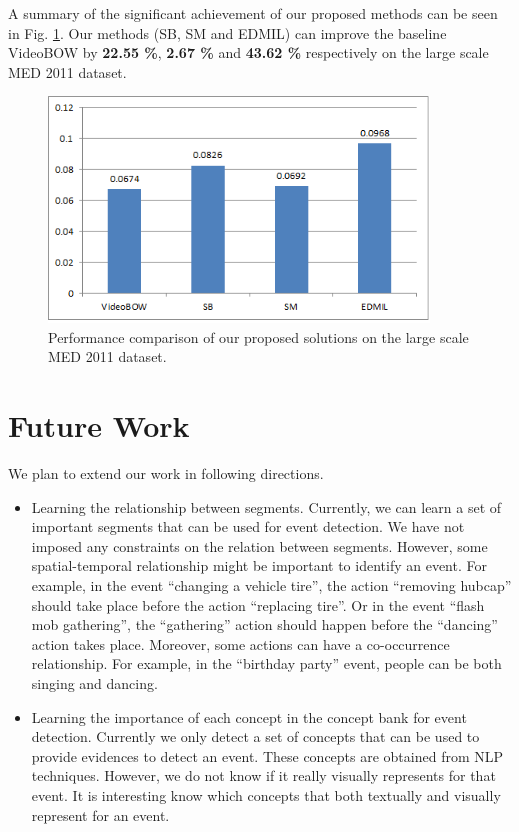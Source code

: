 A summary of the significant achievement of our proposed methods can be seen in Fig. \ref{c6_summary}. Our methods (SB, SM and EDMIL) can improve the baseline VideoBOW by \textbf{22.55 \%}, \textbf{2.67 \%} and \textbf{43.62 \%} respectively on the large scale MED 2011 dataset.

\begin{figure}
	\centering
	\includegraphics[width=0.9\textwidth]{summary.png}
	\caption{Performance comparison of our proposed solutions on the large scale MED 2011 dataset.}
	\label{c6_summary}
\end{figure}
	
\section{Future Work}
We plan to extend our work in following directions.
\begin{itemize}
	\item Learning the relationship between segments. Currently, we can learn a set of important segments that can be used for event detection. We have not imposed any constraints on the relation between segments. However, some spatial-temporal relationship might be important to identify an event. For example, in the event ``changing a vehicle tire'', the action ``removing hubcap'' should take place before the action ``replacing tire''. Or in the event ``flash mob gathering'', the ``gathering'' action should happen before the ``dancing'' action takes place. Moreover, some actions can have a co-occurrence relationship. For example, in the ``birthday party'' event, people can be both singing and dancing. 
	\item Learning the importance of each concept in the concept bank for event detection. Currently we only detect a set of concepts that can be used to provide evidences to detect an event. These concepts are obtained from NLP techniques. However, we do not know if it really visually represents for that event. It is interesting know which concepts that both textually and visually represent for an event.
\end{itemize}

